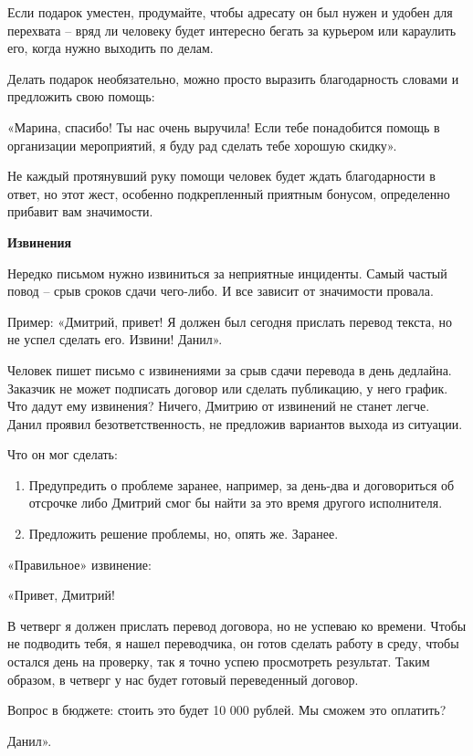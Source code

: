 Если подарок уместен, продумайте, чтобы адресату он был нужен и удобен для перехвата – вряд ли человеку будет интересно бегать за курьером или караулить его, когда нужно выходить по делам.

Делать подарок необязательно, можно просто выразить благодарность словами и предложить свою помощь:

«Марина, спасибо! Ты нас очень выручила! Если тебе понадобится помощь в организации мероприятий, я буду рад сделать тебе хорошую скидку».

Не каждый протянувший руку помощи человек будет ждать благодарности в ответ, но этот жест, особенно подкрепленный приятным бонусом, определенно прибавит вам значимости.

\textbf{Извинения}

Нередко письмом нужно извиниться за неприятные инциденты. Самый частый повод – срыв сроков сдачи чего-либо. И все зависит от значимости провала.

Пример: «Дмитрий, привет! Я должен был сегодня прислать перевод текста, но не успел сделать его. Извини! Данил».

Человек пишет письмо с извинениями за срыв сдачи перевода в день дедлайна. Заказчик не может подписать договор или сделать публикацию, у него график. Что дадут ему извинения? Ничего, Дмитрию от извинений не станет легче. Данил проявил безответственность, не предложив вариантов выхода из ситуации.

Что он мог сделать:

\begin{enumerate}
    \item Предупредить о проблеме заранее, например, за день-два и договориться об отсрочке либо Дмитрий смог бы найти за это время другого исполнителя.
    \item Предложить решение проблемы, но, опять же. Заранее.
\end{enumerate}

«Правильное» извинение:

«Привет, Дмитрий!

В четверг я должен прислать перевод договора, но не успеваю ко времени. Чтобы не подводить тебя, я нашел переводчика, он готов сделать работу в среду, чтобы остался день на проверку, так я точно успею просмотреть результат. Таким образом, в четверг у нас будет готовый переведенный договор.

Вопрос в бюджете: стоить это будет 10 000 рублей. Мы сможем это оплатить?

Данил».

